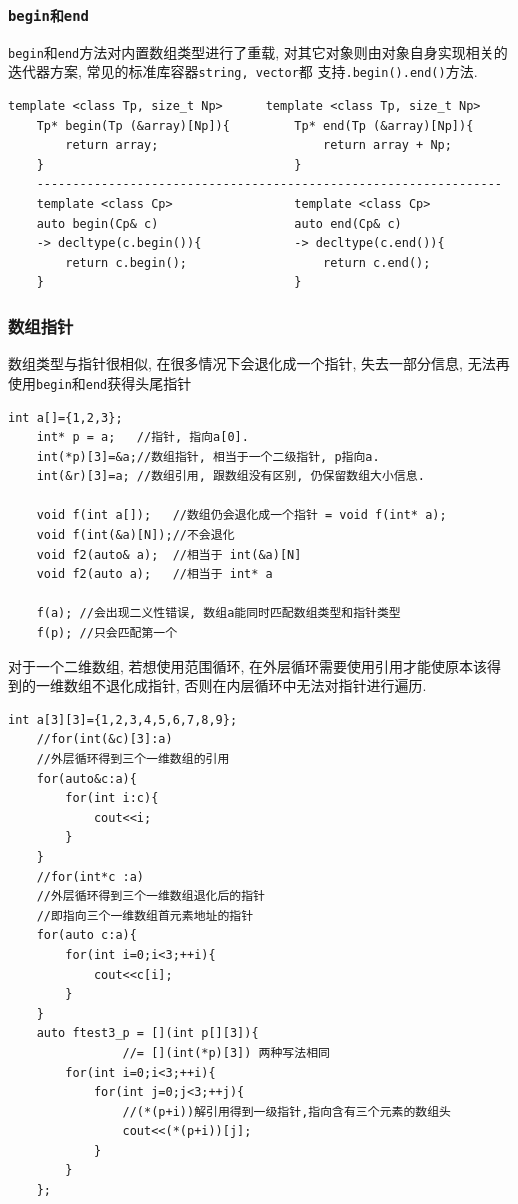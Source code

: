 \subsubsection{\tt{begin}和\tt{end}}
{\tt begin}和{\tt end}方法对内置数组类型进行了重载, 对其它对象则由对象自身实现相关的迭代器方案, 常见的标准库容器{\tt string, vector}都
	支持{\tt .begin().end()}方法.

\begin{lstlisting}[title=部分impl]
	template <class Tp, size_t Np>   	template <class Tp, size_t Np> 
	Tp* begin(Tp (&array)[Np]){			Tp* end(Tp (&array)[Np]){
		return array;						return array + Np;
	}									}
    -----------------------------------------------------------------
	template <class Cp>					template <class Cp>
	auto begin(Cp& c) 					auto end(Cp& c) 
	-> decltype(c.begin()){				-> decltype(c.end()){
		return c.begin();					return c.end();
	}									}
\end{lstlisting}
\subsubsection{数组指针}
数组类型与指针很相似, 在很多情况下会退化成一个指针, 失去一部分信息, 无法再使用{\tt begin}和{\tt end}获得头尾指针

\begin{lstlisting}[xleftmargin=2em,xrightmargin=2em]
	int a[]={1,2,3};
	int* p = a;   //指针, 指向a[0].
	int(*p)[3]=&a;//数组指针, 相当于一个二级指针, p指向a.
	int(&r)[3]=a; //数组引用, 跟数组没有区别, 仍保留数组大小信息.

	void f(int a[]);   //数组仍会退化成一个指针 = void f(int* a);
	void f(int(&a)[N]);//不会退化
	void f2(auto& a);  //相当于 int(&a)[N]
	void f2(auto a);   //相当于 int* a

	f(a); //会出现二义性错误, 数组a能同时匹配数组类型和指针类型
	f(p); //只会匹配第一个
\end{lstlisting}

对于一个二维数组, 若想使用范围循环, 在外层循环需要使用引用才能使原本该得到的一维数组不退化成指针, 否则在内层循环中无法对指针进行遍历.

\begin{lstlisting}[xleftmargin=2em,xrightmargin=2em]
	int a[3][3]={1,2,3,4,5,6,7,8,9};
	//for(int(&c)[3]:a)
	//外层循环得到三个一维数组的引用
	for(auto&c:a){
		for(int i:c){
			cout<<i;
		}
	}
	//for(int*c :a)
	//外层循环得到三个一维数组退化后的指针
	//即指向三个一维数组首元素地址的指针
	for(auto c:a){
		for(int i=0;i<3;++i){
			cout<<c[i];
		}
	}
	auto ftest3_p = [](int p[][3]){
		        //= [](int(*p)[3]) 两种写法相同
		for(int i=0;i<3;++i){
			for(int j=0;j<3;++j){
				//(*(p+i))解引用得到一级指针,指向含有三个元素的数组头
				cout<<(*(p+i))[j];
			}
		}
	};
\end{lstlisting}


